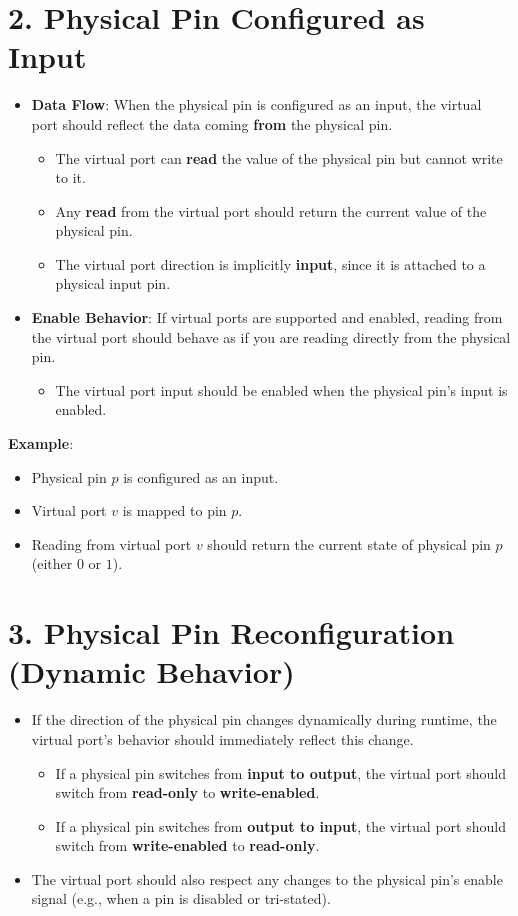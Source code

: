 \section*{2. Physical Pin Configured as Input}
\begin{itemize}
    \item \textbf{Data Flow}: When the physical pin is configured as an input, the virtual port should reflect the data coming \textbf{from} the physical pin.
    \begin{itemize}
        \item The virtual port can \textbf{read} the value of the physical pin but cannot write to it.
        \item Any \textbf{read} from the virtual port should return the current value of the physical pin.
        \item The virtual port direction is implicitly \textbf{input}, since it is attached to a physical input pin.
    \end{itemize}
    \item \textbf{Enable Behavior}: If virtual ports are supported and enabled, reading from the virtual port should behave as if you are reading directly from the physical pin.
    \begin{itemize}
        \item The virtual port input should be enabled when the physical pin’s input is enabled.
    \end{itemize}
\end{itemize}

\textbf{Example}:
\begin{itemize}
    \item Physical pin $p$ is configured as an input.
    \item Virtual port $v$ is mapped to pin $p$.
    \item Reading from virtual port $v$ should return the current state of physical pin $p$ (either $0$ or $1$).
\end{itemize}

\section*{3. Physical Pin Reconfiguration (Dynamic Behavior)}
\begin{itemize}
    \item If the direction of the physical pin changes dynamically during runtime, the virtual port’s behavior should immediately reflect this change.
    \begin{itemize}
        \item If a physical pin switches from \textbf{input to output}, the virtual port should switch from \textbf{read-only} to \textbf{write-enabled}.
        \item If a physical pin switches from \textbf{output to input}, the virtual port should switch from \textbf{write-enabled} to \textbf{read-only}.
    \end{itemize}
    \item The virtual port should also respect any changes to the physical pin's enable signal (e.g., when a pin is disabled or tri-stated).
\end{itemize}

